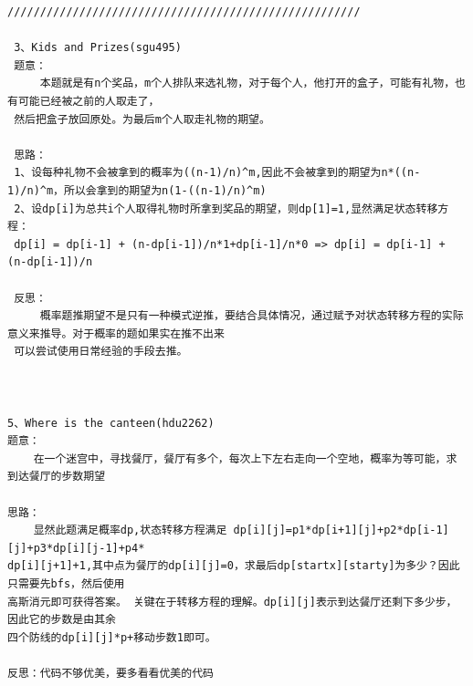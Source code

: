 \documentclass[twoside]{article}
\begin{document}
\begin{lstlisting}
//////////////////////////////////////////////////////
 
 3、Kids and Prizes(sgu495)
 题意：
     本题就是有n个奖品，m个人排队来选礼物，对于每个人，他打开的盒子，可能有礼物，也有可能已经被之前的人取走了，
 然后把盒子放回原处。为最后m个人取走礼物的期望。
 
 思路：
 1、设每种礼物不会被拿到的概率为((n-1)/n)^m,因此不会被拿到的期望为n*((n-1)/n)^m，所以会拿到的期望为n(1-((n-1)/n)^m)
 2、设dp[i]为总共i个人取得礼物时所拿到奖品的期望，则dp[1]=1,显然满足状态转移方程：
 dp[i] = dp[i-1] + (n-dp[i-1])/n*1+dp[i-1]/n*0 => dp[i] = dp[i-1] + (n-dp[i-1])/n 
 
 反思：
     概率题推期望不是只有一种模式逆推，要结合具体情况，通过赋予对状态转移方程的实际意义来推导。对于概率的题如果实在推不出来
 可以尝试使用日常经验的手段去推。
	  

	  
5、Where is the canteen(hdu2262)
题意：
    在一个迷宫中，寻找餐厅，餐厅有多个，每次上下左右走向一个空地，概率为等可能，求到达餐厅的步数期望
    
思路：
    显然此题满足概率dp,状态转移方程满足 dp[i][j]=p1*dp[i+1][j]+p2*dp[i-1][j]+p3*dp[i][j-1]+p4*
dp[i][j+1]+1,其中点为餐厅的dp[i][j]=0，求最后dp[startx][starty]为多少？因此只需要先bfs，然后使用
高斯消元即可获得答案。 关键在于转移方程的理解。dp[i][j]表示到达餐厅还剩下多少步，因此它的步数是由其余
四个防线的dp[i][j]*p+移动步数1即可。

反思：代码不够优美，要多看看优美的代码\end{lstlisting}
\end{document}
